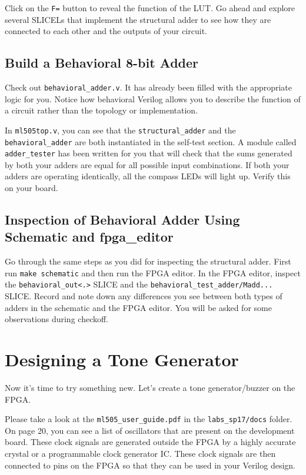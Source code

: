 \documentclass[11pt]{article}
\begin{document}
Click on the \verb|F=| button to reveal the function of the LUT. Go ahead and explore several SLICELs that implement the structural adder to see how they are connected to each other and the outputs of your circuit.

\subsection{Build a Behavioral 8-bit Adder}

Check out \verb|behavioral_adder.v|. It has already been filled with the appropriate logic for you. Notice how behavioral Verilog allows you to describe the function of a circuit rather than the topology or implementation.

In \verb|ml505top.v|, you can see that the \verb|structural_adder| and the \verb|behavioral_adder| are both instantiated in the self-test section. A module called \verb|adder_tester| has been written for you that will check that the sums generated by both your adders are equal for all possible input combinations. If both your adders are operating identically, all the compass LEDs will light up. Verify this on your board.

\subsection{Inspection of Behavioral Adder Using Schematic and fpga\_editor}

Go through the same steps as you did for inspecting the structural adder. First run \verb|make schematic| and then run the FPGA editor. In the FPGA editor, inspect the \verb|behavioral_out<.>| SLICE and the \verb|behavioral_test_adder/Madd...| SLICE. Record and note down any differences you see between both types of adders in the schematic and the FPGA editor. You will be asked for some observations during checkoff.

\section{Designing a Tone Generator}
Now it's time to try something new. Let's create a tone generator/buzzer on the FPGA.

Please take a look at the \verb|ml505_user_guide.pdf| in the \verb|labs_sp17/docs| folder. On page 20, you can see a list of oscillators that are present on the development board. These clock signals are generated outside the FPGA by a highly accurate crystal or a programmable clock generator IC. These clock signals are then connected to pins on the FPGA so that they can be used in your Verilog design.
\end{document}
